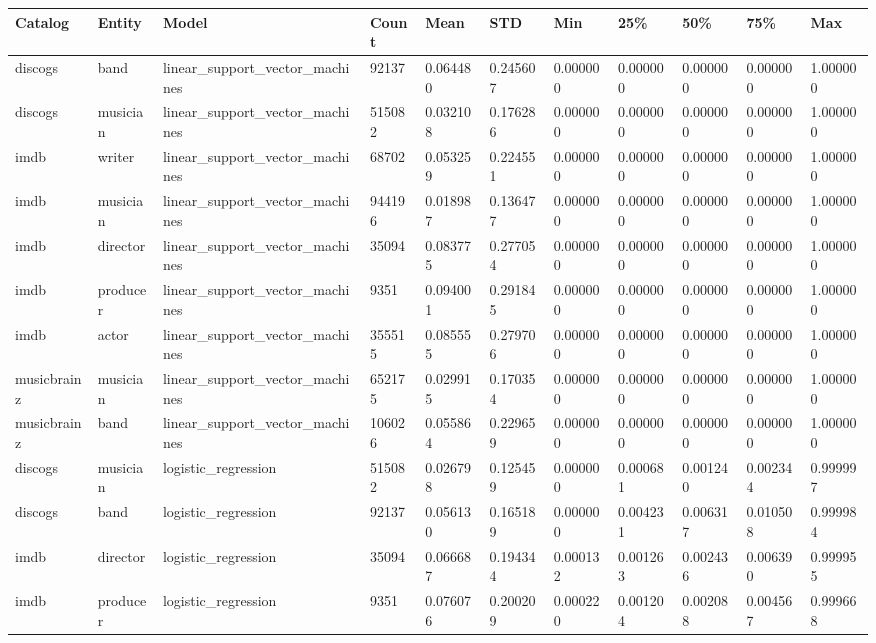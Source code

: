 \documentclass[epsfig,a4paper,11pt,titlepage,twoside,openany]{book}
\begin{document}
\begin{longtable}{|l|l|l|l|l|l|l|l|l|l|l|}
\hline
Catalog     & Entity   & Model                             & Count  & Mean     & STD      & Min      & 25\%     & 50\%     & 75\%     & Max      \\ \hline
discogs     & band     & linear\_support\_vector\_machines & 92137  & 0.064480 & 0.245607 & 0.000000 & 0.000000 & 0.000000 & 0.000000 & 1.000000 \\
discogs     & musician & linear\_support\_vector\_machines & 515082 & 0.032108 & 0.176286 & 0.000000 & 0.000000 & 0.000000 & 0.000000 & 1.000000 \\
imdb        & writer   & linear\_support\_vector\_machines & 68702  & 0.053259 & 0.224551 & 0.000000 & 0.000000 & 0.000000 & 0.000000 & 1.000000 \\
imdb        & musician & linear\_support\_vector\_machines & 944196 & 0.018987 & 0.136477 & 0.000000 & 0.000000 & 0.000000 & 0.000000 & 1.000000 \\
imdb        & director & linear\_support\_vector\_machines & 35094  & 0.083775 & 0.277054 & 0.000000 & 0.000000 & 0.000000 & 0.000000 & 1.000000 \\
imdb        & producer & linear\_support\_vector\_machines & 9351   & 0.094001 & 0.291845 & 0.000000 & 0.000000 & 0.000000 & 0.000000 & 1.000000 \\
imdb        & actor    & linear\_support\_vector\_machines & 355515 & 0.085555 & 0.279706 & 0.000000 & 0.000000 & 0.000000 & 0.000000 & 1.000000 \\
musicbrainz & musician & linear\_support\_vector\_machines & 652175 & 0.029915 & 0.170354 & 0.000000 & 0.000000 & 0.000000 & 0.000000 & 1.000000 \\
musicbrainz & band     & linear\_support\_vector\_machines & 106026 & 0.055864 & 0.229659 & 0.000000 & 0.000000 & 0.000000 & 0.000000 & 1.000000 \\ \hline
discogs     & musician & logistic\_regression              & 515082 & 0.026798 & 0.125459 & 0.000000 & 0.000681 & 0.001240 & 0.002344 & 0.999997 \\
discogs     & band     & logistic\_regression              & 92137  & 0.056130 & 0.165189 & 0.000000 & 0.004231 & 0.006317 & 0.010508 & 0.999984 \\
imdb        & director & logistic\_regression              & 35094  & 0.066687 & 0.194344 & 0.000132 & 0.001263 & 0.002436 & 0.006390 & 0.999955 \\
imdb        & producer & logistic\_regression              & 9351   & 0.076076 & 0.200209 & 0.000220 & 0.001204 & 0.002088 & 0.004567 & 0.999668 \\

\end{longtable}
\end{document}
